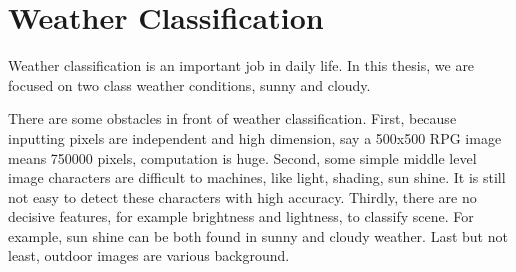 \section{Weather Classification}

Weather classification is an important job in daily life. In this thesis, we are focused on two class weather conditions, sunny and cloudy. 

There are some obstacles in front of weather classification. First, because inputting pixels are independent and high dimension, say a 500x500 RPG image means 750000 pixels, computation is huge. Second, some simple middle level image characters are difficult to machines, like light, shading, sun shine. It is still not easy to detect these characters with high accuracy.  Thirdly, there are no decisive features, for example brightness and lightness, to classify scene. For example, sun shine can be both found in sunny and cloudy weather. Last but not least, outdoor images are various background.


